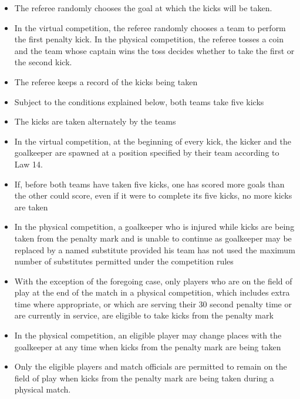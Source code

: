 \begin{itemize}
\item The referee randomly chooses the goal at which the kicks will be taken.
\item In the virtual competition, the referee randomly chooses a team to perform the first penalty kick. In the physical competition, the referee tosses a coin and the team whose captain wins the toss decides whether to take the first or the second kick.
\item The referee keeps a record of the kicks being taken 
\item Subject to the conditions explained below, both teams take five kicks 
\item The kicks are taken alternately by the teams 
\item In the virtual competition, at the beginning of every kick, the kicker and the goalkeeper are spawned at
    a position specified by their team according to Law 14.
\item If, before both teams have taken five kicks, one has scored more goals than the other could score, even if it were to complete its five kicks, no more kicks are taken
\item In the physical competition, a goalkeeper who is injured while kicks are being taken from the penalty mark and is unable to continue as goalkeeper may be replaced by a named substitute provided his team has not used the maximum number of substitutes permitted under the competition rules
\item With the exception of the foregoing case,
      only players who are on the field of play at the end of the match in a physical competition,
      which includes extra time where appropriate,
      or which are serving their 30 second penalty time or are currently in service,
      are eligible to take kicks from the penalty mark

\item In the physical competition, an eligible player may change places with the goalkeeper at any time when kicks from the penalty mark are being taken
\item Only the eligible players and match officials are permitted to
    remain on the field of play when kicks from the penalty mark are being
    taken during a physical match.


\end{itemize}
